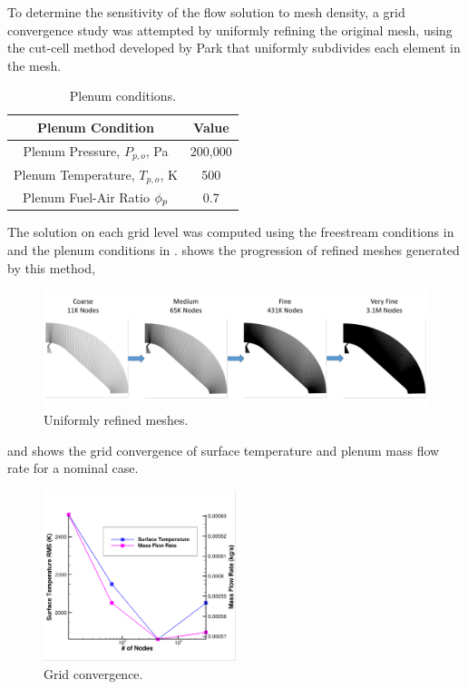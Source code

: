 To determine the sensitivity of the flow solution to mesh density, a grid
convergence study was attempted by uniformly refining the original mesh, using
the cut-cell method developed by Park\cite{park2008anisotropic} that uniformly
subdivides each element in the mesh.
\begin{table}[h]
  \centering
  \begin{tabular}{c|c}
    Plenum Condition & Value \\
    \hline
    Plenum Pressure, $P_{p,o}$, Pa   & 200,000 \\
    Plenum Temperature, $T_{p,o}$, K &  500 \\
    Plenum Fuel-Air Ratio $\phi_p$      &  0.7
  \end{tabular}
  \caption{Plenum conditions.}
  \label{tab:plenum-conditions}
\end{table}
The solution on each grid level was computed using the freestream conditions in
 and the plenum conditions in
.  shows the progression
of refined meshes generated by this method,
\begin{figure}[h]
  \centering
  \includegraphics[width=\textwidth]{figures/mesh-progression.png}
  \caption{Uniformly refined meshes.}
  \label{fig:mesh-refined}
\end{figure}
and  shows the grid convergence of surface
temperature and plenum mass flow rate for a nominal case.
\begin{figure}[!h]
  \centering
  \includegraphics[width=0.5\textwidth]{figures/t-m-conv.png}
  \caption{Grid convergence.}
  \label{fig:grid-convergence}
\end{figure}
